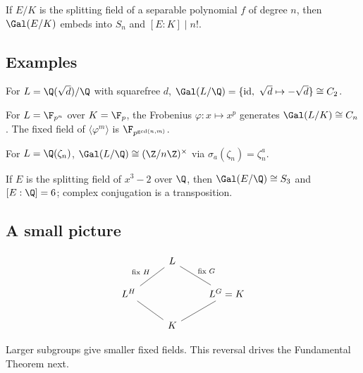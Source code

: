 \begin{corollary}
If $E/K$ is the splitting field of a separable polynomial $f$ of degree $n$, then $\Gal(E/K)$ embeds into $S_n$ and $[E:K]\mid n!$.
\end{corollary}

\subsection{Examples}

\begin{example}[Quadratic]
For $L=\Q(\sqrt{d})/\Q$ with squarefree $d$, $\Gal(L/\Q)=\{\mathrm{id},\ \sqrt{d}\mapsto -\sqrt{d}\}\cong C_2$.
\end{example}

\begin{example}
For $L=\F_{p^n}$ over $K=\F_p$, the Frobenius $\varphi:x\mapsto x^p$ generates $\Gal(L/K)\cong C_n$. The fixed field of $\langle \varphi^m\rangle$ is $\F_{p^{\gcd(n,m)}}$.
\end{example}

\begin{example}[Cyclotomic]
For $L=\Q(\zeta_n)$, $\Gal(L/\Q)\cong (\Z/n\Z)^\times$ via $\sigma_a(\zeta_n)=\zeta_n^a$.
\end{example}

\begin{example}[Cubic $x^3-2$]
If $E$ is the splitting field of $x^3-2$ over $\Q$, then $\Gal(E/\Q)\cong S_3$ and $[E:\Q]=6$; complex conjugation is a transposition.
\end{example}

\subsection{A small picture}
\[
\begin{tikzcd}
& L \arrow[-]{dl}[swap]{\text{fix }H} \arrow[-]{dr}{\text{fix }G} & \\
L^{H} \arrow[-]{dr} & & L^{G}=K \arrow[-]{dl} \\
& K &
\end{tikzcd}
\]
\begin{remark}
Larger subgroups give smaller fixed fields. This reversal drives the Fundamental Theorem next.
\end{remark}
